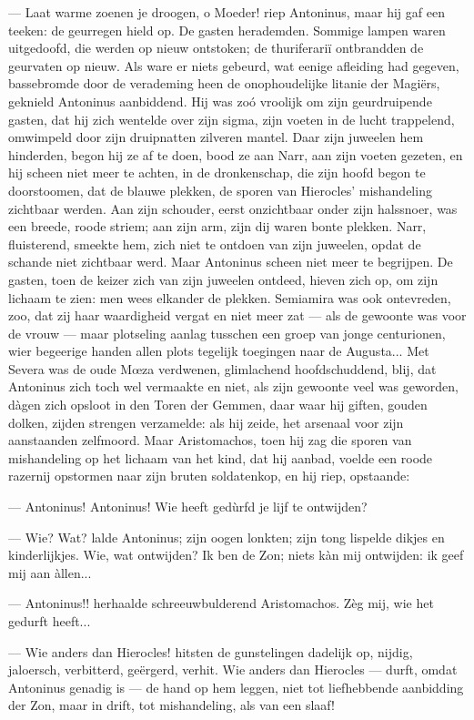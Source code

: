 \documentclass[a4paper, 12pt, oneside, dutch]{article}
\begin{document}
--- Laat warme zoenen je droogen, o Moeder! riep Antoninus, maar hij gaf een teeken: de geurregen hield op. De gasten herademden. Sommige lampen waren uitgedoofd, die werden op nieuw ontstoken; de thuriferariï ontbrandden de geurvaten op nieuw. Als ware er niets gebeurd, wat eenige afleiding had gegeven, bassebromde door de verademing heen de onophoudelijke litanie der Magiërs, geknield Antoninus aanbiddend. Hij was zoó vroolijk om zijn geurdruipende gasten, dat hij zich wentelde over zijn sigma, zijn voeten in de lucht trappelend, omwimpeld door zijn druipnatten zilveren mantel. Daar zijn juweelen hem hinderden, begon hij ze af te doen, bood ze aan Narr, aan zijn voeten gezeten, en hij scheen niet meer te achten, in de dronkenschap, die zijn hoofd begon te doorstoomen, dat de blauwe plekken, de sporen van Hierocles' mishandeling zichtbaar werden. Aan zijn schouder, eerst onzichtbaar onder zijn halssnoer, was een breede, roode striem; aan zijn arm, zijn dij waren bonte plekken. Narr, fluisterend, smeekte hem, zich niet te ontdoen van zijn juweelen, opdat de schande niet zichtbaar werd. Maar Antoninus scheen niet meer te begrijpen. De gasten, toen de keizer zich van zijn juweelen ontdeed, hieven zich op, om zijn lichaam te zien: men wees elkander de plekken. Semiamira was ook ontevreden, zoo, dat zij haar waardigheid vergat en niet meer zat --- als de gewoonte was voor de vrouw --- maar plotseling aanlag tusschen een groep van jonge centurionen, wier begeerige handen allen plots tegelijk toegingen naar de Augusta... Met Severa was de oude Mœza verdwenen, glimlachend hoofdschuddend, blij, dat Antoninus zich toch wel vermaakte en niet, als zijn gewoonte veel was geworden, dàgen zich opsloot in den Toren der Gemmen, daar waar hij giften, gouden dolken, zijden strengen verzamelde: als hij zeide, het arsenaal voor zijn aanstaanden zelfmoord. Maar Aristomachos, toen hij zag die sporen van mishandeling op het lichaam van het kind, dat hij aanbad, voelde een roode razernij opstormen naar zijn bruten soldatenkop, en hij riep, opstaande:

--- Antoninus! Antoninus! Wie heeft gedùrfd je lijf te ontwijden?

--- Wie? Wat? lalde Antoninus; zijn oogen lonkten; zijn tong lispelde dikjes en kinderlijkjes. Wie, wat ontwijden? Ik ben de Zon; niets kàn mij ontwijden: ik geef mij aan àllen...

--- Antoninus!! herhaalde schreeuwbulderend Aristomachos. Zèg mij, wie het gedurft heeft...

--- Wie anders dan Hierocles! hitsten de gunstelingen dadelijk op, nijdig, jaloersch, verbitterd, geërgerd, verhit. Wie anders dan Hierocles --- durft, omdat Antoninus genadig is --- de hand op hem leggen, niet tot liefhebbende aanbidding der Zon, maar in drift, tot mishandeling, als van een slaaf!
\end{document}
